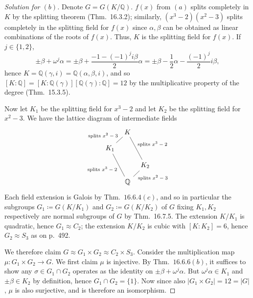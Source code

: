 \documentclass[12pt]{article}
\theoremstyle{remark}
\begin{document}
\begin{proof}[Solution for $(b)$]
  Denote $G = G(K/\mathbb{Q})$. $f(x)$ from $(a)$ splits completely in $K$ by the splitting theorem (Thm.~16.3.2); similarly, $(x^3-2)(x^2-3)$ splits completely in the splitting field for $f(x)$ since $\alpha,\beta$ can be obtained as linear combinations of the roots of $f(x)$. Thus, $K$ is the splitting field for $f(x)$. If $j \in \{1,2\}$,
  \begin{equation*}
    \pm\beta + \omega^j\alpha = \pm\beta + \frac{-1 - (-1)^ji\beta}{2}\alpha = \pm\beta - \frac{1}{2}\alpha - \frac{(-1)^j}{2}i\beta,
  \end{equation*}
  hence $K = \mathbb{Q}(\gamma,i) = \mathbb{Q}(\alpha,\beta,i)$, and so $[K:\mathbb{Q}] = [K:\mathbb{Q}(\gamma)][\mathbb{Q}(\gamma):\mathbb{Q}] = 12$ by the multiplicative property of the degree (Thm.~15.3.5).
  \par Now let $K_1$ be the splitting field for $x^3-2$ and let $K_2$ be the splitting field for $x^2-3$. We have the lattice diagram of intermediate fields
  \begin{equation*}
    \begin{tikzcd}[column sep=tiny,row sep=small,arrows=dash]
      {} & K \ar{dl}[swap]{\text{splits $x^2-3$}} \ar{ddr}{\text{splits $x^3-2$}}\\
      K_1 \ar{ddr}[swap]{\text{splits $x^3-2$}}\\
      & & \mathmakebox[\widthof{$K_1$}]{K_2} \ar{dl}{\text{splits $x^2-3$}}\\
      & \mathbb{Q}
    \end{tikzcd}
  \end{equation*}
  Each field extension is Galois by Thm.~$16.6.4(c)$, and so in particular the subgroups $G_1 \coloneqq G(K/K_1)$ and $G_2 \coloneqq G(K/K_2)$ of $G$ fixing $K_1,K_2$ respectively are normal subgroups of $G$ by Thm.~16.7.5. The extension $K/K_1$ is quadratic, hence $G_1 \approx C_2$; the extension $K/K_2$ is cubic with $[K:K_2]=6$, hence $G_2 \approx S_3$ as on p.~492.
  \par We therefore claim $G \approx G_1 \times G_2 \approx C_2 \times S_3$. Consider the multiplication map $\mu\colon G_1 \times G_2 \to G$. We first claim $\mu$ is injective. By Thm.~$16.6.6(b)$, it suffices to show any $\sigma \in G_1 \cap G_2$ operates as the identity on $\pm\beta + \omega^j\alpha$. But $\omega^j\alpha \in K_1$ and $\pm\beta \in K_2$ by definition, hence $G_1 \cap G_2 = \{1\}$. Now since also $\lvert G_1 \times G_2 \rvert = 12 = \lvert G \rvert$, $\mu$ is also surjective, and is therefore an isomorphism.
\end{proof}
\end{document}
